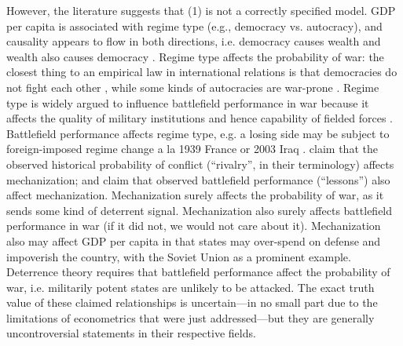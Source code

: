 \documentclass{article}
\begin{document}
However, the literature suggests that (1) is not a correctly specified model. GDP per capita is associated with
regime type (e.g., democracy vs. autocracy), and causality appears to flow in both directions, i.e. democracy
causes wealth and wealth also causes democracy \citep{helliwell1994empirical,barro1996democracy,robinson2006economic,doucouliagos2008democracy}. 
Regime type affects the probability of war: the closest thing to an empirical law in international relations is
that democracies do not fight each other
\citep{levy1988domestic}, while some kinds of autocracies are war-prone \citep{de1995war}. Regime type is widely argued to influence
battlefield performance in war because it affects the quality of military institutions and hence
capability of fielded forces \citep{reiter2002democracies,weeks2014dictators,talmadge2015dictator}. 
Battlefield performance affects regime type, e.g. a losing side may be subject to foreign-imposed
regime change a la 1939 France or 2003 Iraq
\citep{werner1996absolute,lo2008ensuring,downes2013forced}. \citet{sechser2010army} claim that the observed
historical probability of conflict (``rivalry'', in their terminology) affects mechanization; and claim that observed
battlefield performance (``lessons'') also affect mechanization. Mechanization surely affects the
probability of war, as it sends some kind of deterrent signal. Mechanization also surely affects
battlefield performance in war (if it did not, we would not care about it).
Mechanization also may affect GDP per capita in that states may over-spend on defense and 
impoverish the country, with the Soviet Union as a prominent example. Deterrence theory requires that 
battlefield performance affect the probability of war, i.e. militarily 
potent states are unlikely to be attacked. The exact truth value of these claimed relationships is
uncertain---in no small part due to the limitations of econometrics that were just addressed---but
they are generally uncontroversial statements in their respective fields.
\end{document}
